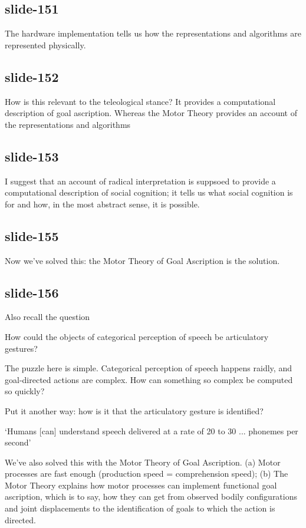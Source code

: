 \documentclass[12pt,\papersize]{extarticle}
\begin{document}
\subsection{slide-151}
The hardware implementation tells us how the representations and algorithms are represented physically.

\subsection{slide-152}
How is this relevant to the teleological stance?
It provides a computational description of goal ascription.
Whereas the Motor Theory provides an account of the representations and algorithms

\subsection{slide-153}
I suggest that an account of radical interpretation is suppsoed to provide
a computational description of social cognition; it tells us what social
cognition is for and how, in the most abstract sense, it is possible.

\subsection{slide-155}
Now we’ve solved this: the Motor Theory of Goal Ascription is the solution.

\subsection{slide-156}
Also recall the question

How could the objects of categorical perception of speech be articulatory gestures?

The puzzle here is simple.
Categorical perception of speech happens raidly, and goal-directed actions
are complex.  How can something so complex be computed so quickly?

Put it another way: how is it that the articulatory gesture is identified?

‘Humans [can] understand speech delivered at a rate of 20 to 30 ... phonemes per second’
\citep{Devlin:2006qg}

We’ve also solved this with the Motor Theory of Goal Ascription.
(a) Motor processes are fast enough (production speed = comprehension speed);
(b) The Motor Theory explains how motor processes can implement functional
goal ascription, which is to say, how they can get from observed bodily configurations
and joint displacements to the identification of goals to which the action is directed.
\end{document}
